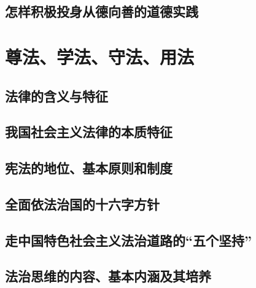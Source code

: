 \subsection{怎样积极投身从德向善的道德实践}

\section{尊法、学法、守法、用法}
\subsection{法律的含义与特征}
\subsection{我国社会主义法律的本质特征}
\subsection{宪法的地位、基本原则和制度}
\subsection{全面依法治国的十六字方针}
\subsection{走中国特色社会主义法治道路的“五个坚持”}
\subsection{法治思维的内容、基本内涵及其培养}
